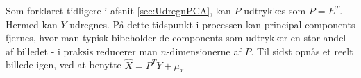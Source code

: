Som forklaret tidligere i afsnit \vref{sec:UdregnPCA}, kan $P$ udtrykkes som $P = E^T$. Hermed kan $Y$ udregnes. På dette tidspunkt i processen kan principal components fjernes, hvor man typisk bibeholder de components som udtrykker en stor andel af billedet - i praksis reducerer man $n$-dimensionerne af $P$. Til sidst opnås et reelt billede igen, ved at benytte $\hat{X} = P^T Y + \mu_{x}$
\\
\\












 